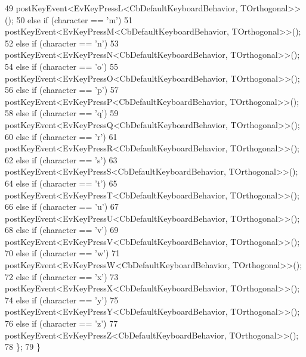 \begin{DoxyCode}
49                 postKeyEvent<EvKeyPressL<CbDefaultKeyboardBehavior, TOrthogonal>>();
50             \textcolor{keywordflow}{else} \textcolor{keywordflow}{if} (character == \textcolor{charliteral}{'m'})
51                 postKeyEvent<EvKeyPressM<CbDefaultKeyboardBehavior, TOrthogonal>>();
52             \textcolor{keywordflow}{else} \textcolor{keywordflow}{if} (character == \textcolor{charliteral}{'n'})
53                 postKeyEvent<EvKeyPressN<CbDefaultKeyboardBehavior, TOrthogonal>>();
54             \textcolor{keywordflow}{else} \textcolor{keywordflow}{if} (character == \textcolor{charliteral}{'o'})
55                 postKeyEvent<EvKeyPressO<CbDefaultKeyboardBehavior, TOrthogonal>>();
56             \textcolor{keywordflow}{else} \textcolor{keywordflow}{if} (character == \textcolor{charliteral}{'p'})
57                 postKeyEvent<EvKeyPressP<CbDefaultKeyboardBehavior, TOrthogonal>>();
58             \textcolor{keywordflow}{else} \textcolor{keywordflow}{if} (character == \textcolor{charliteral}{'q'})
59                 postKeyEvent<EvKeyPressQ<CbDefaultKeyboardBehavior, TOrthogonal>>();
60             \textcolor{keywordflow}{else} \textcolor{keywordflow}{if} (character == \textcolor{charliteral}{'r'})
61                 postKeyEvent<EvKeyPressR<CbDefaultKeyboardBehavior, TOrthogonal>>();
62             \textcolor{keywordflow}{else} \textcolor{keywordflow}{if} (character == \textcolor{charliteral}{'s'})
63                 postKeyEvent<EvKeyPressS<CbDefaultKeyboardBehavior, TOrthogonal>>();
64             \textcolor{keywordflow}{else} \textcolor{keywordflow}{if} (character == \textcolor{charliteral}{'t'})
65                 postKeyEvent<EvKeyPressT<CbDefaultKeyboardBehavior, TOrthogonal>>();
66             \textcolor{keywordflow}{else} \textcolor{keywordflow}{if} (character == \textcolor{charliteral}{'u'})
67                 postKeyEvent<EvKeyPressU<CbDefaultKeyboardBehavior, TOrthogonal>>();
68             \textcolor{keywordflow}{else} \textcolor{keywordflow}{if} (character == \textcolor{charliteral}{'v'})
69                 postKeyEvent<EvKeyPressV<CbDefaultKeyboardBehavior, TOrthogonal>>();
70             \textcolor{keywordflow}{else} \textcolor{keywordflow}{if} (character == \textcolor{charliteral}{'w'})
71                 postKeyEvent<EvKeyPressW<CbDefaultKeyboardBehavior, TOrthogonal>>();
72             \textcolor{keywordflow}{else} \textcolor{keywordflow}{if} (character == \textcolor{charliteral}{'x'})
73                 postKeyEvent<EvKeyPressX<CbDefaultKeyboardBehavior, TOrthogonal>>();
74             \textcolor{keywordflow}{else} \textcolor{keywordflow}{if} (character == \textcolor{charliteral}{'y'})
75                 postKeyEvent<EvKeyPressY<CbDefaultKeyboardBehavior, TOrthogonal>>();
76             \textcolor{keywordflow}{else} \textcolor{keywordflow}{if} (character == \textcolor{charliteral}{'z'})
77                 postKeyEvent<EvKeyPressZ<CbDefaultKeyboardBehavior, TOrthogonal>>();
78         \};
79     \}
\end{DoxyCode}
